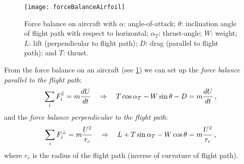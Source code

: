 \begin{figure}[!h!]
  \begin{center}
    \texttt{[image: forceBalanceAirfoil]}
    \caption{\label{FIG_FORCE_BALANCE_AIRCRAFT}Force balance on aircraft with $\alpha$: angle-of-attack; $\theta$: inclination angle of flight path with respect to horizontal; $\alpha_T$: thrust-angle; $W$: weight; $L$: lift (perpendicular to flight path); $D$: drag (parallel to flight path); and $T$: thrust.}
  \end{center}
\end{figure}

From the force balance on an aircraft (see \cref{FIG_FORCE_BALANCE_AIRCRAFT}) we can set up the {\it force balance parallel to the flight path}:
\begin{equation}
   \sum_i F^\parallel_i = m{\frac{dU}{dt}}\quad \Rightarrow\quad T\cos\alpha_T - W\sin\theta -D = m{\frac{dU}{dt}} \, \text{,}
\end{equation}
and the {\it force balance perpendicular to the flight path}:
\begin{equation}
  \sum_i F^\perp_i = m{\frac{U^2}{r_c}}\quad \Rightarrow\quad L+T\sin\alpha_T-W\cos\theta = m{\frac{U^2}{r_c}} \, \text{,}
\end{equation}
where $r_c$ is the radius of the flight path (inverse of curvature of flight path).

